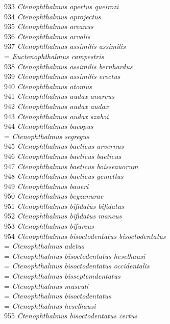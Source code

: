 \documentclass[
]{article}
\begin{document}
933 \emph{Ctenophthalmus apertus queirozi}\\
934 \emph{Ctenophthalmus aprojectus}\\
935 \emph{Ctenophthalmus arcanus}\\
936 \emph{Ctenophthalmus arvalis}\\
937 \emph{Ctenophthalmus assimilis assimilis}\\
= \emph{Euctenophthalmus campestris}\\
938 \emph{Ctenophthalmus assimilis bernhardus}\\
939 \emph{Ctenophthalmus assimilis erectus}\\
940 \emph{Ctenophthalmus atomus}\\
941 \emph{Ctenophthalmus audax anarcus}\\
942 \emph{Ctenophthalmus audax audax}\\
943 \emph{Ctenophthalmus audax szaboi}\\
944 \emph{Ctenophthalmus bacopus}\\
= \emph{Ctenophthalmus segregus}\\
945 \emph{Ctenophthalmus baeticus arvernus}\\
946 \emph{Ctenophthalmus baeticus baeticus}\\
947 \emph{Ctenophthalmus baeticus boisseauorum}\\
948 \emph{Ctenophthalmus baeticus gemellus}\\
949 \emph{Ctenophthalmus baueri}\\
950 \emph{Ctenophthalmus beyzanurae}\\
951 \emph{Ctenophthalmus bifidatus bifidatus}\\
952 \emph{Ctenophthalmus bifidatus mancus}\\
953 \emph{Ctenophthalmus bifurcus}\\
954 \emph{Ctenophthalmus bisoctodentatus bisoctodentatus}\\
= \emph{Ctenophthalmus adetus}\\
= \emph{Ctenophthalmus bisoctodentatus heselhausi}\\
= \emph{Ctenophthalmus bisoctodentatus occidentalis}\\
= \emph{Ctenophthalmus bisseptemdentatus}\\
= \emph{Ctenophthalmus musculi}\\
= \emph{Ctenophthalmus bisoctodentatus}\\
= \emph{Ctenophthalmus heselhausi}\\
955 \emph{Ctenophthalmus bisoctodentatus certus}\\
\end{document}
